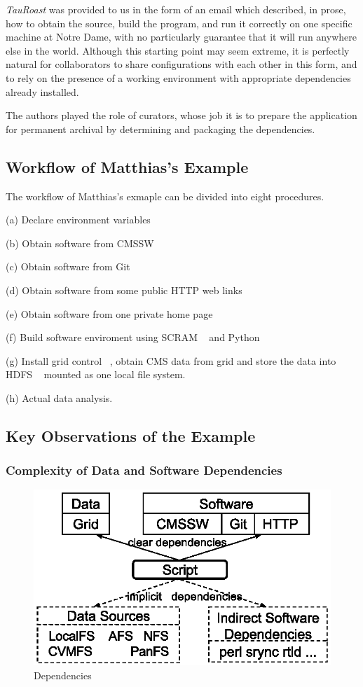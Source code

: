 \documentclass{acm_proc_article-sp}
\begin{document}
\emph{TauRoast} was provided to us in the form of an
email which described, in prose, how to obtain the source,
build the program, and run it correctly on one specific
machine at Notre Dame, with no particularly guarantee that
it will run anywhere else in the world.
Although this starting point may seem extreme, it is
perfectly natural for collaborators to share configurations
with each other in this form, and to rely on the presence
of a working environment with appropriate dependencies already
installed.

The authors played the role of curators, whose job it is to prepare the application for permanent archival by determining and packaging the dependencies.

\subsection{Workflow of Matthias's Example}

The workflow of Matthias's exmaple can be divided into eight procedures.

(a) Declare environment variables

(b) Obtain software from CMSSW

(c) Obtain software from Git

(d) Obtain software from some public HTTP web links

(e) Obtain software from one private home page

(f) Build software enviroment using SCRAM ~\cite{rabbertz2004cms} and Python

(g) Install grid control ~\cite{holtman2001cms}, obtain CMS data from grid and store the data into HDFS ~\cite{borthakur2008hdfs} mounted as one local file system.

(h) Actual data analysis.

\subsection{Key Observations of the Example}

\subsubsection{Complexity of Data and Software Dependencies}

\begin{figure}[t]
\centering
\includegraphics[width=.8\columnwidth]{dependencies.eps}
\caption{Dependencies}
\label{fig:dependencies}
\end{figure}
\end{document}
